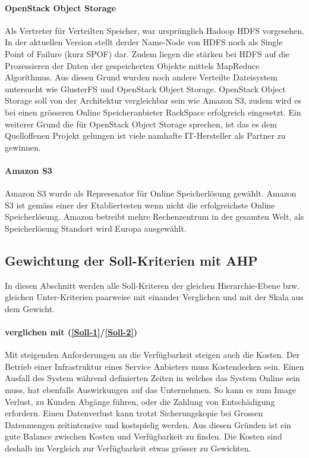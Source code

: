 \paragraph{OpenStack Object Storage}\label{Al-4}

Als Vertreter für Verteilten Speicher, war ursprünglich Hadoop HDFS vorgesehen. In der aktuellen Version stellt derder Name-Node von HDFS noch als Single Point of Failure (kurz SPOF) dar. Zudem liegen die stärken bei HDFS auf die Prozessieren der Daten der gespeicherten Objekte mittels MapReduce Algorithmus. Aus diesen Grund wurden noch andere Verteilte Dateisystem untersucht wie GlusterFS und OpenStack Object Storage. OpenStack Object Storage soll von der Architektur vergleichbar sein wie Amazon S3, zudem wird es bei einen grösseren Online Speicheranbieter RackSpace erfolgreich eingesetzt. Ein weiterer Grund die für OpenStack Object Storage sprechen, ist das es dem Quelloffenen Projekt gelungen ist viele namhafte IT-Hersteller als Partner zu gewinnen.

\paragraph{Amazon S3}\label{Al-5}
Amazon S3 wurde als Represenator für Online Speicherlösung gewählt. Amazon S3 ist gemäss  einer der Etabliertesten wenn nicht die erfolgreichste Online Speicherlösung. Amazon betreibt mehre Rechenzentrum in der gesamten Welt, als Speicherlösung Standort wird Europa ausgewählt.


\subsection{Gewichtung der Soll-Kriterien mit AHP}

In diesen Abschnitt werden alle Soll-Kriteren der gleichen Hierarchie-Ebene bzw. gleichen Unter-Kriterien paarweise mit einander Verglichen und mit der Skala  aus dem  Gewicht.

\paragraph*{ verglichen mit  (\ref{Soll-1}/\ref{Soll-2})} 
Mit steigenden Anforderungen an die Verfügbarkeit steigen auch die Kosten. Der Betrieb einer Infrastruktur eines Service Anbieters muss Kostendecken sein. Einen Ausfall des System während definierten Zeiten in welches das System Online sein muss, hat ebenfalls Auswirkungen auf das Unternehmen. So kann es zum Image Verlust, zu Kunden Abgänge führen, oder die Zahlung von Entschädigung erfordern. Einen Datenverlust kann trotzt Sicherungskopie bei Grossen Datenmengen zeitintensive und kostspielig werden. Aus diesen Gründen ist ein gute Balance zwischen Kosten und Verfügbarkeit zu finden. Die Kosten sind deshalb im Vergleich zur Verfügbarkeit etwas grösser zu Gewichten.

